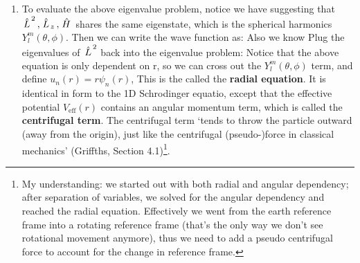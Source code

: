\documentclass{school-22.101-notes}
\begin{document}
\begin{enumerate}
\item To evaluate the above eigenvalue problem, notice we have
suggesting that $\left. \hat{L} \right.^2, \left. \hat{L} \right._z, \left. \hat{H} \right.$ shares the same eigenstate, which is the spherical harmonics $Y_l^m (\theta, \phi)$. Then we can write the wave function as:
Also we know 
Plug the eigenvalues of $\left. \hat{L} \right.^2$ back into the eigenvalue problem: 
Notice that the above equation is only dependent on r, so we can cross out the $Y_l^m (\theta, \phi)$ term, and define $\displaystyle u_n(r) = r \psi_n (r)$,
This is the called the \textbf{radial equation}. It is identical in form to the 1D Schrodinger equatio, except that the effective potential $V_{\mathrm{eff}} (r)$ contains an angular momentum term, which is called the \textbf{centrifugal term}. The centrifugal term `tends to throw the particle outward (away from the origin), just like the centrifugal (pseudo-)force in classical mechanics' (Griffths, Section 4.1)\footnote{My understanding: we started out with both radial and angular dependency; after separation of variables, we solved for the angular dependency and reached the radial equation. Effectively we went from the earth reference frame into a rotating reference frame (that's the only way we don't see rotational movement anymore), thus we need to add a pseudo centrifugal force to account for the change in reference frame.}.    
\end{enumerate}
\end{document}

